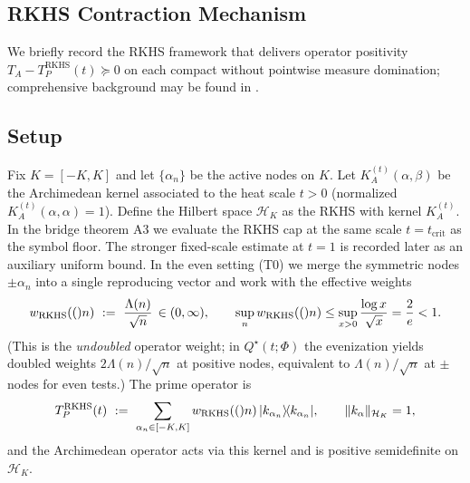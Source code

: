 \subsection{RKHS Contraction Mechanism}
We briefly record the RKHS framework that delivers operator positivity $T_A-T_P^{\mathrm{RKHS}}(t)\succeq0$ on each compact without pointwise measure domination; comprehensive background may be found in \cite{Aronszajn1950,BerlinetThomasAgnan2004,PaulsenRaghupathi2016,Berlinet2004,Paulsen2016}.

\subsection{Setup}
Fix $K=[-K,K]$ and let $\{\alpha_n\}$ be the active nodes on $K$. Let $K_A^{(t)}(\alpha,\beta)$ be the Archimedean kernel associated to the heat scale $t>0$ (normalized $K_A^{(t)}(\alpha,\alpha)=1$). Define the Hilbert space $\mathcal H_K$ as the RKHS with kernel $K_A^{(t)}$. In the bridge theorem A3 we evaluate the RKHS cap at the same scale $t=t_{\mathrm{crit}}$ as the symbol floor. The stronger fixed-scale estimate at $t=1$ is recorded later as an auxiliary uniform bound. In the even setting (T0) we merge the symmetric nodes $\pm\alpha_n$ into a single reproducing vector and work with the effective weights
\begin{equation}\label{eq:RKHS_contraction-formula-8}
 w_{\mathrm{RKHS}}(()n)\ :=\ \frac{\Lambda(n)}{\sqrt n}\,\in(0,\infty),\qquad \sup_n w_{\mathrm{RKHS}}(()n)\le \sup_{x>0}\frac{\log x}{\sqrt x}=\frac{2}{e}<1.
\end{equation}
(This is the \emph{undoubled} operator weight; in $Q^\star(t;\Phi)$ the evenization yields doubled weights $2\Lambda(n)/\sqrt n$ at positive nodes, equivalent to $\Lambda(n)/\sqrt n$ at $\pm$ nodes for even tests.)
The prime operator is
\begin{equation}\label{eq:RKHS_contraction-formula-9}
T_P^{\mathrm{RKHS}}(t)\ :=\ \sum_{\alpha_n\in[-K,K]} w_{\mathrm{RKHS}}(()n)\, |k_{\alpha_n}\rangle\!\langle k_{\alpha_n}|,\qquad \|k_{\alpha}\|_{\mathcal H_K}=1,
\end{equation}
and the Archimedean operator acts via this kernel and is positive semidefinite on $\mathcal H_K$.

